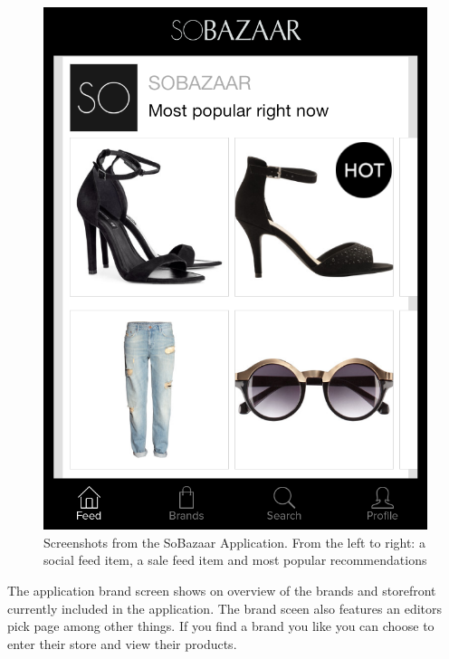 \begin{figure}[H]
\begin{minipage}{.30\linewidth}
				\includegraphics[height=1.5\linewidth]{image/SoBazaarmostpop.png}
		\end{minipage}
		\caption[SoBazaar newsfeed screenshots - version 0.5.1]{Screenshots from the SoBazaar Application. From the left to right: a social feed item, a sale feed item and most popular recommendations}
		\label{figure:SoBazaarfeed}
	\end{figure}

	The application brand screen shows on overview of the brands and storefront currently included in the application. The brand sceen also features an editors pick page among other things. If you find a brand you like you can choose to enter their store and view their products.

